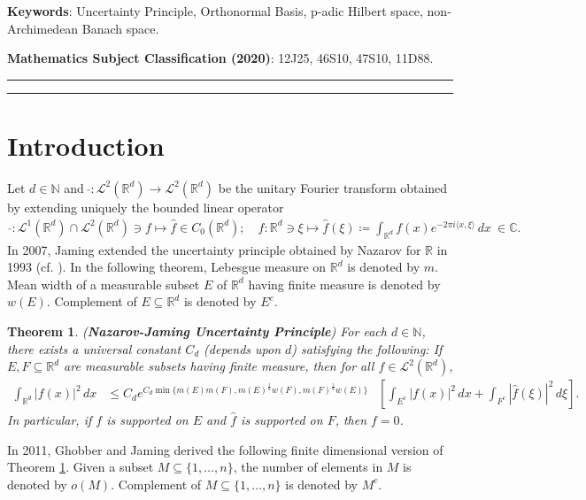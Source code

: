 \documentclass{amsart}
\newtheorem{theorem}{Theorem}[section]
\begin{document}
\textbf{Keywords}:   Uncertainty Principle, Orthonormal Basis,  p-adic Hilbert space, non-Archimedean Banach space.

\textbf{Mathematics Subject Classification (2020)}: 12J25, 46S10, 47S10, 11D88.\\

\hrule


\hrule
\section{Introduction}
Let $d \in \mathbb{N}$ and  $~\widehat{}:\mathcal{L}^2 (\mathbb{R}^d) \to \mathcal{L}^2 (\mathbb{R}^d)$ be the unitary Fourier transform obtained by extending uniquely the bounded linear operator 
\begin{align*}
\widehat{}:\mathcal{L}^1 (\mathbb{R}^d)\cap  \mathcal{L}^2	 (\mathbb{R}^d) \ni f \mapsto \widehat{f} \in  C_0(\mathbb{R}^d); \quad \widehat{f}: \mathbb{R}^d \ni \xi \mapsto \widehat{f}(\xi)\coloneqq \int_{\mathbb{R}^d}	f(x)e^{-2\pi i  \langle x, \xi \rangle}\,dx\ \in \mathbb{C}.
\end{align*}
In 2007, Jaming \cite{JAMING} extended the uncertainty principle obtained by Nazarov for $\mathbb{R}$ in 1993 \cite{NAZAROV} (cf. \cite{HARVINJORICKE}). In the following theorem, Lebesgue measure on $\mathbb{R}^d$ is denoted by $m$. Mean width of a measurable subset  $E$ of $\mathbb{R}^d$ having finite measure  is denoted by $w(E)$. Complement of  $E\subseteq\mathbb{R}^d$ is denoted by $E^c$.
\begin{theorem} \cite{JAMING, NAZAROV}\label{JN} (\textbf{Nazarov-Jaming Uncertainty Principle}) For each $d \in \mathbb{N}$, there exists a universal constant $C_d$ (depends upon $d$) satisfying the following: If $E, F \subseteq \mathbb{R}^d$ are measurable subsets having finite measure, then for all $f \in \mathcal{L}^2 (\mathbb{R}^d)$, 
	\begin{align*}
\int_{\mathbb{R}^d}	|f(x)|^2\,dx &\leq C_d e^{C_d \min \{m(E)m(F), m(E)^\frac{1}{d}w(F), m(F)^\frac{1}{d}w(E)\}} 
&\left[\int_{E^c}	|f(x)|^2\,dx+\int_{F^c}	|\widehat{f}(\xi)|^2\,d\xi\right].
	\end{align*} 
In particular, if $f$ is supported on $E$ and 	$\widehat{f}$ is supported on $F$, then $f=0$. 
\end{theorem}
In 2011, Ghobber and Jaming derived the following finite dimensional version of 
Theorem \ref{JN}.  Given a subset  $M\subseteq \{1, \dots, n\}$, the number of elements in $M$ is denoted by $o(M)$. Complement of $M\subseteq \{1, \dots, n\}$ is denoted by $M^c$. 
\end{document}
